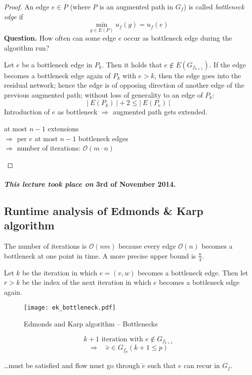 \documentclass{article}
\newcommand{\card}[1]{\left|\:\!#1\:\!\right|}
\newcommand{\dateref}[1]{\paragraph{\textit{This lecture took place on} #1.}}
\begin{document}
\begin{proof}
  An edge $e \in P$ (where $P$ is an augmented path in $G_f$) is called \emph{bottleneck edge} if
  \[
    \min_{g \in E(P)} u_f(g) = u_f(e)
  \]
  \textbf{Question.}
    How often can some edge $e$ occur as bottleneck edge during the algorithm run?

    Let $e$ be a bottleneck edge in $P_k$. Then it holds that $e \notin E(G_{f_{k+1}})$. If the edge becomes a bottleneck edge again of $P_k$ with $e > k$, then the edge goes into the residual network; hence the edge is of opposing direction of another edge of the previous augmented path; without loss of generality to an edge of $P_k$:
    \[
      \card{E(P_k)} + 2 \leq \card{E(P_e)}
    \]
    Introduction of $e$ as bottleneck $\Rightarrow$ augmented path gets extended.
    \begin{center}
      at most $n - 1$ extensions \\
      $\Rightarrow$ per $e$ at most $n-1$ bottleneck edges \\
      $\Rightarrow$ number of iterations: $\mathcal{O}(m\cdot n)$
    \end{center}
\end{proof}

\dateref{3rd of November 2014}

\subsection{Runtime analysis of Edmonds \& Karp algorithm}

The number of iterations is $\mathcal{O}(nm)$ because every edge $\mathcal{O}(n)$ becomes a bottleneck at one point in time. A more precise upper bound is $\frac{n}{4}$.

Let $k$ be the iteration in which $e = (v, w)$ becomes a bottleneck edge. Then let $r > k$ be the index of the next iteration in which $e$ becomes a bottleneck edge again.

\begin{figure}[h]
 \begin{center}
  \texttt{[image: ek\_bottleneck.pdf]}
  \caption{Edmonds and Karp algorithm -- Bottlenecks}
 \end{center}
\end{figure}

\[
  k+1 \text{ iteration with } e \notin G_{f_{k+1}}
\] \[
  \Rightarrow \quad \overleftarrow{e} \in G_{f_p}(k+1 \leq p)
\]
\begin{center}
  \dots must be satisfied and flow must go through $\overleftarrow{e}$ such that $e$ can recur in $G_f$.
\end{center}
\end{document}
